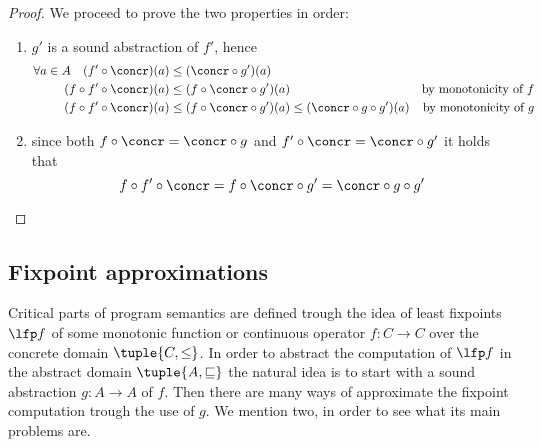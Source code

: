\begin{proof}
  We proceed to prove the two properties in order:
  \begin{enumerate}[label=(\arabic*)]
  \item \(g'\) is a sound abstraction of \(f'\), hence
    \begin{align*}
      \forall a \in A \quad (f'\circ \concr)(a) & \leq (\concr \circ g') (a) \\
      (f \circ f' \circ \concr)(a) & \leq (f \circ \concr \circ g')(a) & \text{by monotonicity of } f \\
      (f \circ f' \circ \concr)(a) & \leq (f \circ \concr \circ g')(a) \leq (\concr \circ g \circ g')(a) & \text{by monotonicity of } g
    \end{align*}
  \item since both \({f \circ \concr = \concr \circ g}\) and
    \({f' \circ \concr = \concr \circ g'}\) it holds that
    \begin{equation*}
      f \circ f' \circ \concr =  f \circ \concr \circ g' = \concr \circ g \circ g'
    \end{equation*}
  \end{enumerate}
\end{proof}

\subsection{Fixpoint approximations}\label{subsec:fixpointapprox}
Critical parts of program semantics are defined trough the idea of
least fixpoints \(\lfp f\) of some monotonic function or continuous
operator \(f : C \to C\) over the concrete domain
\(\tuple{C,\leq}\). In order to abstract the computation of \(\lfp f\)
in the abstract domain \(\tuple{A,\sqsubseteq}\) the natural idea is
to start with a sound abstraction \(g : A \to A\) of \(f\). Then there
are many ways of approximate the fixpoint computation trough the use
of \(g\). We mention two, in order to see what its main problems are.

